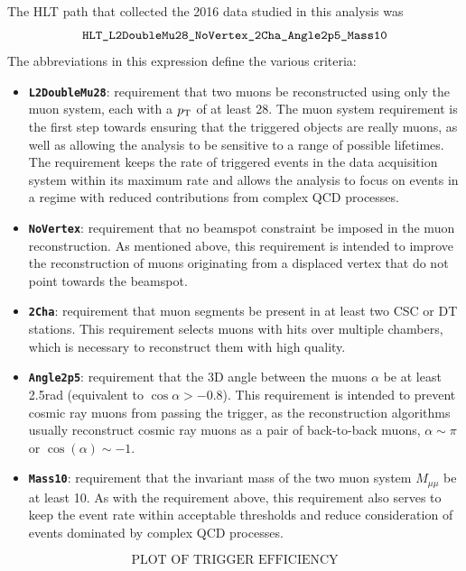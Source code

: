 The HLT path that collected the 2016 data studied in this analysis was
$$\texttt{HLT\_L2DoubleMu28\_NoVertex\_2Cha\_Angle2p5\_Mass10}$$
The abbreviations in this expression define the various criteria:
\begin{itemize}
  \item \texttt{\textbf{L2DoubleMu28}}: requirement that two muons be reconstructed using only the muon system, each with a $p_{\mathrm{T}}$ of at least 28\GeV. The muon system requirement is the first step towards ensuring that the triggered objects are really muons, as well as allowing the analysis to be sensitive to a range of possible lifetimes. The \pT requirement keeps the rate of triggered events in the data acquisition system within its maximum rate and allows the analysis to focus on events in a regime with reduced contributions from complex QCD processes.
  \item \texttt{\textbf{NoVertex}}: requirement that no beamspot constraint be imposed in the muon reconstruction. As mentioned above, this requirement is intended to improve the reconstruction of muons originating from a displaced vertex that do not point towards the beamspot.
  \item \texttt{\textbf{2Cha}}: requirement that muon segments be present in at least two CSC or DT stations. This requirement selects muons with hits over multiple chambers, which is necessary to reconstruct them with high quality.
  \item \texttt{\textbf{Angle2p5}}: requirement that the 3D angle between the muons $\alpha$ be at least 2.5\unit{rad} (equivalent to $\cos{\alpha} > -0.8$). This requirement is intended to prevent cosmic ray muons from passing the trigger, as the reconstruction algorithms usually reconstruct cosmic ray muons as a pair of back-to-back muons, \ie $\alpha \sim \pi$ or $\cos(\alpha) \sim -1$.
  \item \texttt{\textbf{Mass10}}: requirement that the invariant mass of the two muon system $M_{\mu\mu}$ be at least 10\GeV. As with the \pT requirement above, this requirement also serves to keep the event rate within acceptable thresholds and reduce consideration of events dominated by complex QCD processes.
\end{itemize}

$$\text{PLOT OF TRIGGER EFFICIENCY}$$

